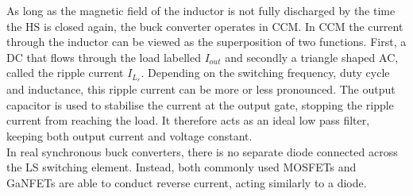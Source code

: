As long as the magnetic field of the inductor is not fully discharged by the time the \ac{HS} is closed again, the buck converter operates in \ac{CCM}. In \ac{CCM} the current through the inductor can be viewed as the superposition of two functions. First, a \ac{DC} that flows through the load labelled $I_{out}$ and secondly a triangle shaped \ac{AC}, called the ripple current $I_{L_r}$. Depending on the switching frequency, duty cycle and inductance, this ripple current can be more or less pronounced. The output capacitor is used to stabilise the current at the output gate, stopping the ripple current from reaching the load. It therefore acts as an ideal low pass filter, keeping both output current and voltage constant.\\
In real synchronous buck converters, there is no separate diode connected across the \ac{LS} switching element. Instead, both commonly used \acp{MOSFET} and \acp{GaNFET} are able to conduct reverse current, acting similarly to a diode. \\

